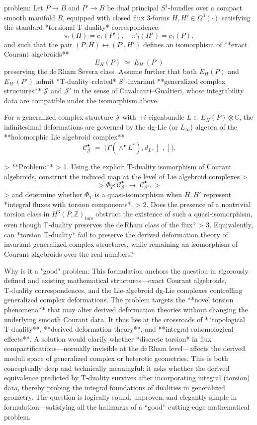 problem:  
Let \(P \to B\) and \(P' \to B\) be dual principal \(S^1\)-bundles over a compact smooth manifold \(B\), equipped with closed flux 3‑forms \(H,H' \in \Omega^3(\cdot)\) satisfying the standard *torsional T‑duality* correspondence:
\[
\pi_!(H)=c_1(P'),\quad \pi'_!(H')=c_1(P),
\]
and such that the pair \((P,H)\leftrightarrow (P',H')\) defines an isomorphism of **exact Courant algebroids**
\[
E_H(P) \;\simeq\; E_{H'}(P')
\]
preserving the de Rham Ševera class.  
Assume further that both \(E_H(P)\) and \(E_{H'}(P')\) admit *T‑duality–related* \(S^1\)-invariant **generalized complex structures** \( \mathcal{J} \) and \( \mathcal{J}' \) in the sense of Cavalcanti–Gualtieri, whose integrability data are compatible under the isomorphism above.

For a generalized complex structure \(\mathcal{J}\) with \(+i\)-eigenbundle \(L\subset E_H(P)\otimes\mathbb{C}\), the infinitesimal deformations are governed by the dg‑Lie (or \(L_\infty\)) algebra of the **holomorphic Lie algebroid complex**
\[
\mathcal{C}_{\mathcal{J}}^\bullet \;=\; \big(\Gamma(\!\wedge^\bullet L^*),d_L,[\,\ ,\,]\big).
\]

> **Problem:**  
> 1. Using the explicit T‑duality isomorphism of Courant algebroids, construct the induced map at the level of Lie algebroid complexes
> \[
> \Phi_T: \mathcal{C}_{\mathcal{J}}^\bullet \;\longrightarrow\; \mathcal{C}_{\mathcal{J}'}^\bullet,
> \]
> and determine whether \(\Phi_T\) is a quasi‑isomorphism when \(H,H'\) represent *integral fluxes with torsion components*.  
> 2. Does the presence of a nontrivial torsion class in \(H^3(P,\mathbb{Z})_{\mathrm{tors}}\) obstruct the existence of such a quasi‑isomorphism, even though T‑duality preserves the de Rham class of the flux?  
> 3. Equivalently, can *torsion T‑duality* fail to preserve the derived deformation theory of invariant generalized complex structures, while remaining an isomorphism of Courant algebroids over the real numbers?

Why is it a "good" problem:  
This formulation anchors the question in rigorously defined and existing mathematical structures—exact Courant algebroids, T‑duality correspondences, and the Lie‑algebroid dg‑Lie complexes controlling generalized complex deformations. The problem targets the **novel torsion phenomena** that may alter derived deformation theories without changing the underlying smooth Courant data.  
It thus lies at the crossroads of **topological T‑duality**, **derived deformation theory**, and **integral cohomological effects**. A solution would clarify whether *discrete torsion* in flux compactifications—normally invisible at the de Rham level—affects the derived moduli space of generalized complex or heterotic geometries.  
This is both conceptually deep and technically meaningful: it asks whether the derived equivalence predicted by T‑duality survives after incorporating integral (torsion) data, thereby probing the integral foundations of dualities in generalized geometry. The question is logically sound, unproven, and elegantly simple in formulation—satisfying all the hallmarks of a “good” cutting‑edge mathematical problem.